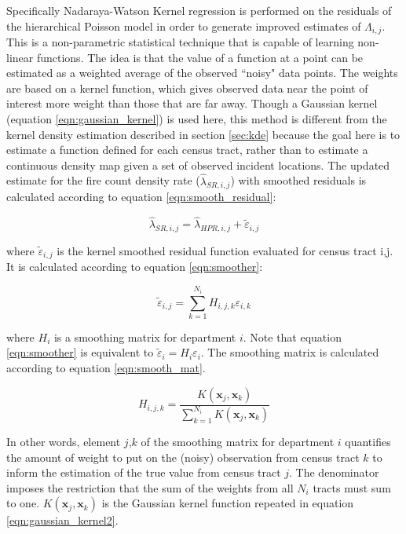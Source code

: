 \documentclass{svjour3}
\begin{document}
Specifically Nadaraya-Watson\cite{nadaraya1964estimating} Kernel regression is performed on the residuals of the hierarchical Poisson model in order to generate improved estimates of $\Lambda_{i,j}$. This is a non-parametric statistical technique that is capable of learning non-linear functions. The idea is that the value of a function at a point can be estimated as a weighted average of the observed ``noisy" data points.  The weights are based on a kernel function, which gives observed data near the point of interest more weight than those that are far away. Though a Gaussian kernel (equation \ref{eqn:gaussian_kernel}) is used here, this method is different from the kernel density estimation described in section \ref{sec:kde} because the goal here is to estimate a function defined for each census tract, rather than to estimate a continuous density map given a set of observed incident locations. The updated estimate for the fire count density rate ($\hat{\lambda}_{SR,i,j}$) with smoothed residuals is calculated according to equation \ref{eqn:smooth_residual}:

\begin{equation}
  \label{eqn:smooth_residual}
  \hat\lambda_{SR,i,j} = \hat{\lambda}_{HPR,i,j} + \tilde{\varepsilon}_{i,j}
\end{equation}

\noindent where $\tilde{\varepsilon}_{i,j}$ is the kernel smoothed residual function evaluated for census tract i,j. It is calculated according to equation \ref{eqn:smoother}:

\begin{equation}
  \label{eqn:smoother}
  \tilde{\varepsilon}_{i,j} = \sum_{k=1}^{N_i} H_{i,j,k}\varepsilon_{i,k}
\end{equation}

\noindent where $H_i$ is a smoothing matrix for department $i$. Note that equation \ref{eqn:smoother} is equivalent to $\tilde{\varepsilon}_{i} = H_{i}\varepsilon_{i}$. The smoothing matrix is calculated according to equation \ref{eqn:smooth_mat}.

\begin{equation}
  \label{eqn:smooth_mat}
  H_{i,j,k} = \frac{K(\textbf{x}_j,\textbf{x}_k)}{\sum_{k=1}^{N_i}K(\textbf{x}_j,\textbf{x}_k)}
\end{equation}

\noindent In other words, element $j$,$k$ of the smoothing matrix for department $i$ quantifies the amount of weight to put on the (noisy) observation from census tract $k$ to inform the estimation of the true value from census tract $j$. The denominator imposes the restriction that the sum of the weights from all $N_i$ tracts must sum to one. $K(\textbf{x}_j, \textbf{x}_k)$ is the Gaussian kernel function repeated in equation \ref{eqn:gaussian_kernel2}.
\end{document}

